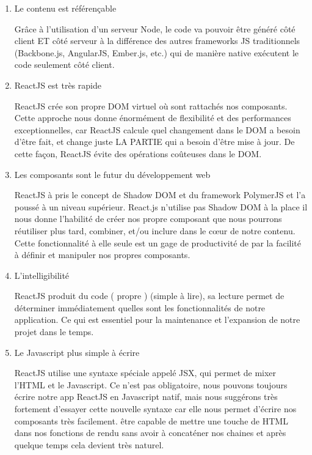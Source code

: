 \begin{enumerate}
\item Le contenu est r\'ef\'eren\c{c}able

Gr\^ace \`a l'utilisation d'un serveur Node, le code va pouvoir \^etre g\'en\'er\'e c\^ot\'e client ET c\^ot\'e serveur \`a la diff\'erence des autres frameworks JS traditionnels (Backbone.js, AngularJS, Ember.js, etc.) qui de mani\`ere native ex\'ecutent le code seulement c\^ot\'e client.

\item ReactJS est tr\`es rapide

ReactJS cr\'ee son propre DOM virtuel o\`u sont rattach\'es nos composants. Cette approche nous donne \'enorm\'ement de flexibilit\'e et des performances exceptionnelles, car ReactJS calcule quel changement dans le DOM a besoin d'\^etre fait, et change juste LA PARTIE qui a besoin d'\^etre mise \`a jour. De cette fa\c{c}on, ReactJS \'evite des op\'erations co\^uteuses dans le DOM.

\item Les composants sont le futur du d\'eveloppement web

ReactJS \`a pris le concept de Shadow DOM et du framework PolymerJS et l'a pouss\'e \`a un niveau sup\'erieur. React.js n'utilise pas Shadow DOM \`a la place il nous donne l'habilit\'e de cr\'eer nos propre composant que nous pourrons r\'eutiliser plus tard, combiner, et/ou inclure dans le c\oe{}ur de notre contenu. Cette fonctionnalit\'e \`a elle seule est un gage de productivit\'e de par la facilit\'e \`a d\'efinir et manipuler nos propres composants.

\item L'intelligibilit\'e

ReactJS produit du code ( propre ) (simple \`a lire), sa lecture permet de d\'eterminer imm\'ediatement quelles sont les fonctionnalit\'es de notre application. Ce qui est essentiel pour la maintenance et l'expansion de notre projet dans le temps.

\item Le Javascript plus simple \`a \'ecrire

ReactJS utilise une syntaxe sp\'eciale appel\'e JSX, qui permet de mixer l'HTML et le Javascript. Ce n'est pas obligatoire, nous pouvons toujours \'ecrire notre app ReactJS en Javascript natif, mais nous sugg\'erons tr\`es fortement d'essayer cette nouvelle syntaxe car elle nous permet d'\'ecrire nos composants tr\`es facilement. \^etre capable de mettre une touche de HTML dans nos fonctions de rendu sans avoir \`a concat\'ener nos chaines et apr\`es quelque temps cela devient tr\`es naturel.

\end{enumerate}



